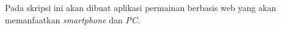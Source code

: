 \documentclass[a4paper,twoside]{article}
\begin{document}
		
Pada skripsi ini akan dibuat aplikasi permainan berbasis web yang akan memanfaatkan \textit{smartphone} dan \textit{PC}.
\end{document}
